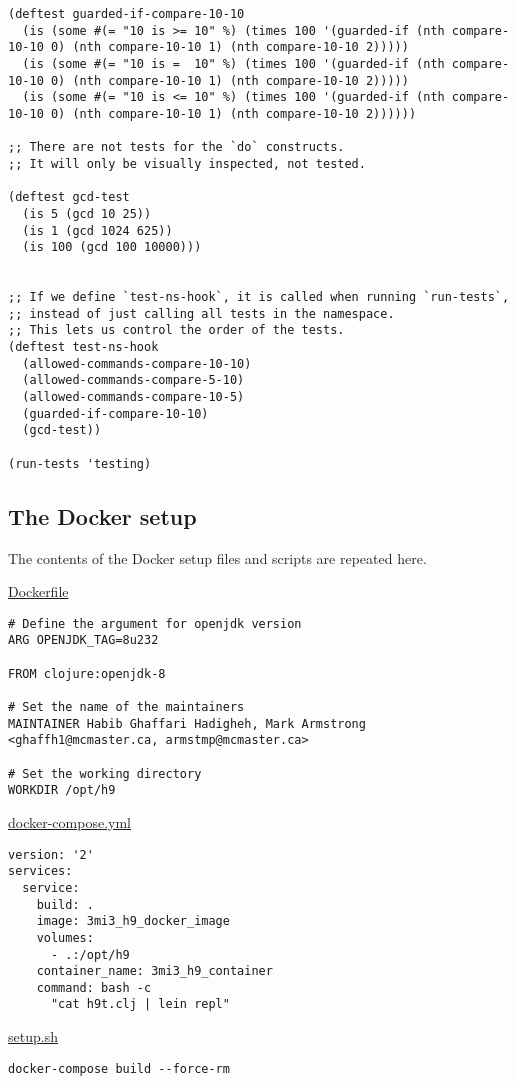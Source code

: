 \documentclass[11pt]{article}
\begin{document}
\begin{verbatim}
(deftest guarded-if-compare-10-10
  (is (some #(= "10 is >= 10" %) (times 100 '(guarded-if (nth compare-10-10 0) (nth compare-10-10 1) (nth compare-10-10 2)))))
  (is (some #(= "10 is =  10" %) (times 100 '(guarded-if (nth compare-10-10 0) (nth compare-10-10 1) (nth compare-10-10 2)))))
  (is (some #(= "10 is <= 10" %) (times 100 '(guarded-if (nth compare-10-10 0) (nth compare-10-10 1) (nth compare-10-10 2))))))

;; There are not tests for the `do` constructs.
;; It will only be visually inspected, not tested.

(deftest gcd-test
  (is 5 (gcd 10 25))
  (is 1 (gcd 1024 625))
  (is 100 (gcd 100 10000)))


;; If we define `test-ns-hook`, it is called when running `run-tests`,
;; instead of just calling all tests in the namespace.
;; This lets us control the order of the tests.
(deftest test-ns-hook
  (allowed-commands-compare-10-10)
  (allowed-commands-compare-5-10)
  (allowed-commands-compare-10-5)
  (guarded-if-compare-10-10)
  (gcd-test))

(run-tests 'testing)
\end{verbatim}

\subsection*{The Docker setup}
\label{sec:orgd61b11d}
The contents of the Docker setup files and scripts are repeated here.

\href{./testing/h9/Dockerfile}{Dockerfile}
\begin{verbatim}
# Define the argument for openjdk version
ARG OPENJDK_TAG=8u232

FROM clojure:openjdk-8
    
# Set the name of the maintainers
MAINTAINER Habib Ghaffari Hadigheh, Mark Armstrong <ghaffh1@mcmaster.ca, armstmp@mcmaster.ca>

# Set the working directory
WORKDIR /opt/h9
\end{verbatim}

\href{./testing/h9/docker-compose.yml}{docker-compose.yml}
\begin{verbatim}
version: '2'
services:
  service:
    build: .
    image: 3mi3_h9_docker_image
    volumes:
      - .:/opt/h9
    container_name: 3mi3_h9_container
    command: bash -c
      "cat h9t.clj | lein repl"
\end{verbatim}

\href{./testing/h9/setup.sh}{setup.sh}
\begin{verbatim}
docker-compose build --force-rm
\end{verbatim}
\end{document}
